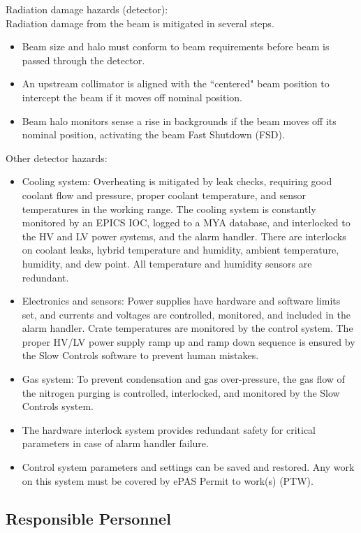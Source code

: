 Radiation damage hazards (detector):\\

Radiation damage from the beam is mitigated in several steps. 
\begin{itemize}
\item Beam size and halo must conform to beam requirements before beam is passed through the 
detector. 
\item An upstream collimator is aligned with the ``centered" beam position to intercept the 
beam if it moves off nominal position. 
\item Beam halo monitors sense a rise in backgrounds if the beam moves off its nominal position, 
activating the beam Fast Shutdown (FSD). 
\end{itemize}

Other detector hazards:
\begin{itemize}
\item Cooling system: Overheating is mitigated by leak checks, requiring good coolant flow and 
pressure, proper coolant temperature, and sensor temperatures in the working range. The cooling 
system is constantly monitored by an EPICS IOC, logged to a MYA database, and interlocked to 
the HV and LV power systems, and the alarm handler. There are interlocks on coolant leaks, 
hybrid temperature and humidity, ambient temperature, humidity, and dew point. All temperature 
and humidity sensors are redundant.
\item Electronics and sensors: Power supplies have hardware and software limits set, and currents 
and voltages are controlled, monitored, and included in the alarm handler. Crate temperatures 
are monitored by the control system. The proper HV/LV power supply ramp up and ramp down sequence 
is ensured by the Slow Controls software to prevent human mistakes. 
\item Gas system: To prevent condensation and gas over-pressure, the gas flow of the nitrogen 
purging is controlled, interlocked, and monitored by the Slow Controls system. 
\item The hardware interlock system provides redundant safety for critical parameters in case of 
alarm handler failure. 
\item Control system parameters and settings can be saved and restored.  Any work on this system
must be covered by ePAS Permit to work(s) (PTW).
\end{itemize}

\vfil
\eject

\subsection{Responsible Personnel}

